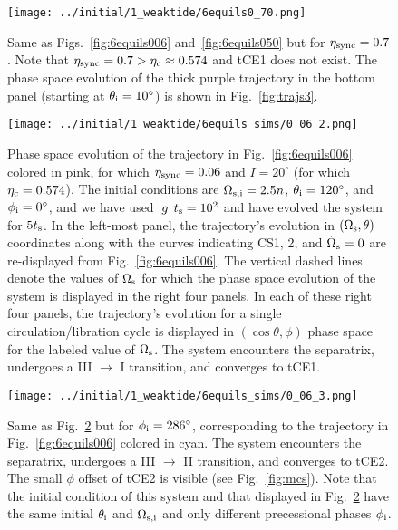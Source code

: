 \documentclass[
        fleqn,
        usenatbib,
        referee,
    ]{mnras}
\newcommand*{\abs}[1]{\left|#1\right|}
\newcommand*{\p}[1]{\left(#1\right)}
\newlength{\colummwidth}
\begin{document}
\begin{figure*}
    \centering
    \texttt{[image: ../initial/1\_weaktide/6equils0\_70.png]}
    \caption{Same as Figs.~\ref{fig:6equils006} and~\ref{fig:6equils050} but for
    $\eta_{\rm sync} = 0.7$. Note that $\eta_{\rm sync} = 0.7 > \eta_{\rm c}
    \approx 0.574$ and tCE1 does not exist. The phase space evolution of the
    thick purple trajectory in the bottom panel (starting at $\theta_{\rm i}
    = 10^\circ$) is shown in Fig.~\ref{fig:trajs3}. }\label{fig:6equils070}
\end{figure*}
\begin{figure}
    \centering
    \texttt{[image: ../initial/1\_weaktide/6equils\_sims/0\_06\_2.png]}
    \caption{Phase space evolution of the trajectory in
    Fig.~\ref{fig:6equils006} colored in pink, for which $\eta_{\rm sync} =
    0.06$ and $I = 20^\circ$ (for which $\eta_{\rm c} = 0.574$). The initial
    conditions are $\Omega_{\rm s, i} = 2.5n$, $\theta_{\rm i} = 120^\circ$, and
    $\phi_{\rm i} = 0^\circ$, and we have used $\abs{g}t_{\rm s} = 10^2$ and
    have evolved the system for $5t_{\rm s}$. In the left-most panel, the
    trajectory's evolution in $\p{\Omega_{\rm s}, \theta}$ coordinates along
    with the curves indicating CS1, 2, and $\dot{\Omega}_{\rm s} = 0$ are
    re-displayed from Fig.~\ref{fig:6equils006}. The vertical dashed lines
    denote the values of $\Omega_{\rm s}$ for which the phase space evolution of
    the system is displayed in the right four panels. In each of these right
    four panels, the trajectory's evolution for a single circulation/libration
    cycle is displayed in $\p{\cos \theta, \phi}$ phase space for the labeled
    value of $\Omega_{\rm s}$. The system encounters the separatrix, undergoes a
    III $\to$ I transition, and converges to tCE1.
    }\label{fig:trajs1}
\end{figure}
\begin{figure}
    \texttt{[image: ../initial/1\_weaktide/6equils\_sims/0\_06\_3.png]}
    \caption{Same as Fig.~\ref{fig:trajs1} but for $\phi_{\rm i} = 286^\circ$,
    corresponding to the trajectory in Fig.~\ref{fig:6equils006} colored in
    cyan. The system encounters the separatrix, undergoes a III $\to$ II
    transition, and converges to tCE2. The small $\phi$ offset of tCE2 is
    visible (see Fig.~\ref{fig:mcs}). Note that the initial condition of this
    system and that displayed in Fig.~\ref{fig:trajs1} have the same initial
    $\theta_{\rm i}$ and $\Omega_{\rm s, i}$ and only different precessional
    phases $\phi_{\rm i}$.
    }\label{fig:trajs2}
\end{figure}
\end{document}
